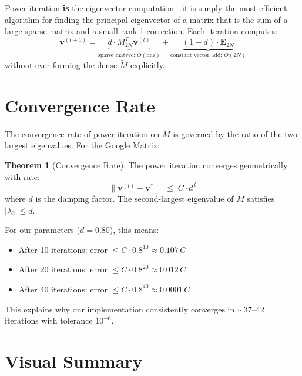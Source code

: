 \documentclass[11pt,a4paper]{article}
\theoremstyle{definition}
\newtheorem{theorem}{Theorem}
\begin{document}
\begin{tcolorbox}[colback=blue!5,colframe=darkblue,title=Key Insight]
Power iteration \textbf{is} the eigenvector computation---it is simply the
most efficient algorithm for finding the principal eigenvector of a matrix
that is the sum of a large sparse matrix and a small rank-1 correction.
Each iteration computes:
\[
\bm{v}^{(t+1)} = \underbrace{d \cdot M_{2N}^T \bm{v}^{(t)}}_{\text{sparse
matvec: } O(\text{nnz})} + \underbrace{(1-d) \cdot
\bm{E}_{2N}}_{\text{constant vector add: } O(2N)}
\]
without ever forming the dense $\widetilde{M}$ explicitly.
\end{tcolorbox}

\section{Convergence Rate}

The convergence rate of power iteration on $\widetilde{M}$ is governed by
the ratio of the two largest eigenvalues.  For the Google Matrix:

\begin{theorem}[{Convergence Rate}]
The power iteration converges geometrically with rate:
\[
\|\bm{v}^{(t)} - \bm{v}^*\| \;\leq\; C \cdot d^{\,t}
\]
where $d$ is the damping factor.  The second-largest eigenvalue of
$\widetilde{M}$ satisfies $|\lambda_2| \leq d$.
\end{theorem}

For our parameters ($d = 0.80$), this means:
\begin{itemize}
  \item After 10 iterations: error $\leq C \cdot 0.8^{10} \approx 0.107\,C$
  \item After 20 iterations: error $\leq C \cdot 0.8^{20} \approx 0.012\,C$
  \item After 40 iterations: error $\leq C \cdot 0.8^{40} \approx 0.0001\,C$
\end{itemize}

This explains why our implementation consistently converges in
$\sim$37--42 iterations with tolerance $10^{-6}$.

\section{Visual Summary}
\end{document}
